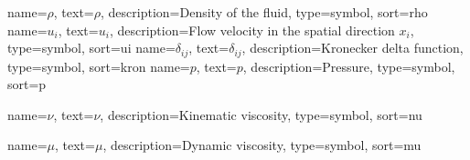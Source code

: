 






{
  name={$\rho$},
  text={\ensuremath{\rho}},
  description={Density of the fluid},
  type=symbol,
  sort=rho
}
{
  name={$u_i$},
  text={\ensuremath{u_i}},
  description={Flow velocity in the spatial direction $x_i$},
  type=symbol,
  sort=ui
}
{
  name={$\delta_{ij}$},
  text={\ensuremath{\delta_{ij}}},
  description={Kronecker delta function},
  type=symbol,
  sort=kron
}
{
  name={$p$},
  text={\ensuremath{p}},
  description={Pressure},
  type=symbol,
  sort=p
}

{
  name={$\nu$},
  text={\ensuremath{\nu}},
  description={Kinematic viscosity},
  type=symbol,
  sort=nu
}

{
  name={$\mu$},
  text={\ensuremath{\mu}},
  description={Dynamic viscosity},
  type=symbol,
  sort=mu
}


